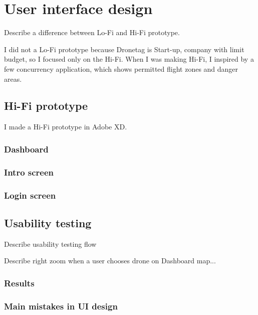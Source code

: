 \chapter{User interface design}\label{ch:user-interface-design}

Describe a difference between Lo-Fi and Hi-Fi prototype.

I did not a Lo-Fi prototype because Dronetag is Start-up, company with limit budget, so I focused only on the Hi-Fi.
When I was making Hi-Fi, I inspired by a few concurrency application, which shows permitted flight zones and danger areas.
\section{Hi-Fi prototype}\label{sec:hi-fi-prototype}
I made a Hi-Fi prototype in Adobe XD.

\subsection{Dashboard}\label{subsec:dashboard2}

\subsection{Intro screen}\label{subsec:intro-screen}

\subsection{Login screen}\label{subsec:login-screen}

\section{Usability testing}\label{sec:usability-testing}
Describe usability testing flow

Describe right zoom when a user chooses drone on Dashboard map...

\subsection{Results}\label{subsec:results}

\subsection{Main mistakes in UI design}\label{subsec:main-mistakes-in-ui-design}